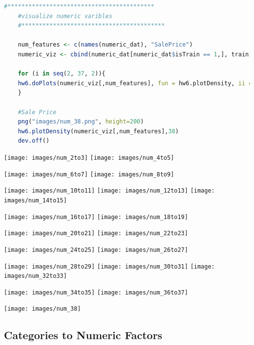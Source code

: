 \documentclass[sigconf]{acmart}
\begin{document}
	\begin{lstlisting}[language=R]
	#******************************************
	#visualize numeric varibles
	#*****************************************
	
	num_features <- c(names(numeric_dat), "SalePrice")
	numeric_viz <- cbind(numeric_dat[numeric_dat$isTrain == 1,], train['SalePrice'])
	
	for (i in seq(2, 37, 2)){
	hw6.doPlots(numeric_viz[,num_features], fun = hw6.plotDensity, ii = i:(i+1), ncol = 2, saveAsFile = paste0("num_",i,"to",i+1, ".png"), 200)
	}
	
	#Sale Price
	png("images/num_38.png", height=200)
	hw6.plotDensity(numeric_viz[,num_features],38)
	dev.off()
	\end{lstlisting}
	
	
	\begin{center}
		\texttt{[image: images/num\_2to3]}
		\texttt{[image: images/num\_4to5]} 
		
		\texttt{[image: images/num\_6to7]} 
		\texttt{[image: images/num\_8to9]} 
		
		\texttt{[image: images/num\_10to11]}
		\texttt{[image: images/num\_12to13]}
		\texttt{[image: images/num\_14to15]}
		
		\texttt{[image: images/num\_16to17]}
		\texttt{[image: images/num\_18to19]}
		
		\texttt{[image: images/num\_20to21]}
		\texttt{[image: images/num\_22to23]} 
		
		\texttt{[image: images/num\_24to25]} 
		\texttt{[image: images/num\_26to27]} 
		
		\texttt{[image: images/num\_28to29]}
		\texttt{[image: images/num\_30to31]}
		\texttt{[image: images/num\_32to33]}
		
		\texttt{[image: images/num\_34to35]}
		\texttt{[image: images/num\_36to37]}
		
		\texttt{[image: images/num\_38]}
	\end{center}
	
	\subsection{Categories to Numeric Factors}
\end{document}
